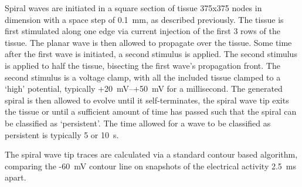 Spiral waves are initiated in a square section of tissue 375x375 nodes in
dimension with a space step of 0.1~mm, as described previously.  The tissue is
first stimulated along one edge via current injection of the first 3 rows of the
tissue.  The planar wave is then allowed to propagate over the tissue.  Some
time after the first wave is initiated, a second stimulus is applied.  The
second stimulus is applied to half the tissue, bisecting the first wave's
propagation front.  The second stimulus is a voltage clamp, with all the
included tissue clamped to a `high' potential, typically +20~mV--+50~mV for a
millisecond.  The generated spiral is then allowed to evolve until it
self-terminates, the spiral wave tip exits the tissue or until a sufficient
amount of time has passed such that the spiral can be classified as
`persistent'.  The time allowed for a wave to be classified as persistent is
typically 5 or 10~s.

The spiral wave tip traces are calculated via a standard contour based
algorithm, comparing the -60~mV contour line on snapshots of the electrical
activity 2.5~ms apart.
